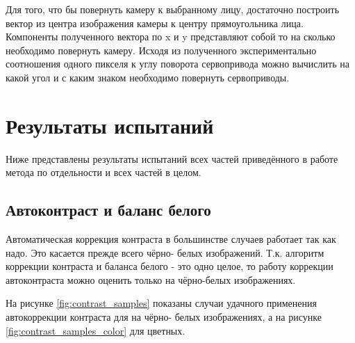 \documentclass[12pt]{report}
\begin{document}
Для того, что бы повернуть камеру к выбранному лицу, достаточно построить вектор из центра изображения камеры к 
центру  
прямоугольника лица. Компоненты полученного вектора по x и y представляют собой то на сколько необходимо повернуть 
камеру. Исходя из полученного экспериментально соотношения одного пикселя к углу поворота сервопривода можно 
вычислить на какой угол и с каким знаком необходимо повернуть сервоприводы.




\chapter{Результаты испытаний}
\thispagestyle{fancy}

Ниже представлены результаты испытаний всех частей приведённого в работе метода по отдельности и всех частей в 
целом.

\section{Автоконтраст и баланс белого}
\label{sec:contrast_results}
Автоматическая коррекция контраста в большинстве случаев работает так как надо. Это касается прежде всего чёрно-
белых 
изображений. Т.к. алгоритм коррекции контраста и баланса белого - это одно целое, то работу коррекции автоконтраста 
можно оценить только на чёрно-белых изображениях. 

На рисунке \ref{fig:contrast_samples} показаны случаи удачного применения автокоррекции контраста для на чёрно-
белых 
изображениях, а на рисунке \ref{fig:contrast_samples_color} для цветных.
\end{document}
